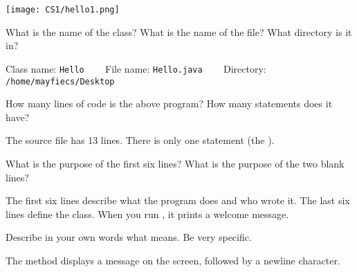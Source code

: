 
\begin{center}
\texttt{[image: CS1/hello1.png]}
\end{center}



\Q What is the name of the class?
What is the name of the file?
What directory is it in?

\begin{answer}
Class name: \texttt{Hello} ~~~
File name: \texttt{Hello.java} ~~~
Directory: \texttt{/home/mayfiecs/Desktop}
\end{answer}


\Q How many lines of code is the above program?
How many statements does it have?

\begin{answer}
The source file has 13 lines.
There is only one statement (the ).
\end{answer}


\Q What is the purpose of the first six lines?
What is the purpose of the two blank lines?

\begin{answer}
The first six lines describe what the program does and who wrote it.
The last six lines define the  class.
When you run , it prints a welcome message.
\end{answer}


\Q Describe in your own words what  means.
Be very specific.

\begin{answer}
The  method displays a message on the screen, followed by a newline character.
\end{answer}
